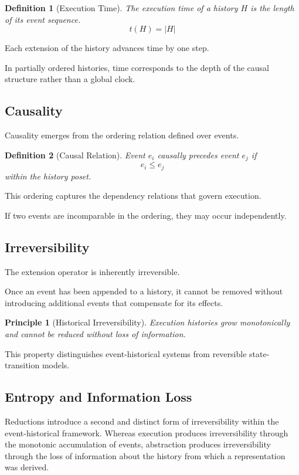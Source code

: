 \documentclass[12pt]{article}
\newtheorem{definition}{Definition}
\newtheorem{principle}{Principle}
\begin{document}
\begin{definition}[Execution Time]
The execution time of a history $H$ is the length of
its event sequence.
\[
t(H) = |H|
\]
\end{definition}

Each extension of the history advances time by one step.

In partially ordered histories, time corresponds to the
depth of the causal structure rather than a global clock.

\subsection{Causality}

Causality emerges from the ordering relation
defined over events.

\begin{definition}[Causal Relation]
Event $e_i$ causally precedes event $e_j$ if
\[
e_i \leq e_j
\]
within the history poset.
\end{definition}

This ordering captures the dependency relations
that govern execution.

If two events are incomparable in the ordering,
they may occur independently.

\subsection{Irreversibility}

The extension operator is inherently irreversible.

Once an event has been appended to a history,
it cannot be removed without introducing additional
events that compensate for its effects.

\begin{principle}[Historical Irreversibility]
Execution histories grow monotonically and cannot
be reduced without loss of information.
\end{principle}

This property distinguishes event-historical systems
from reversible state-transition models.

\subsection{Entropy and Information Loss}

Reductions introduce a second and distinct form of irreversibility
within the event-historical framework. Whereas execution produces
irreversibility through the monotonic accumulation of events,
abstraction produces irreversibility through the loss of
information about the history from which a representation was
derived.
\end{document}
